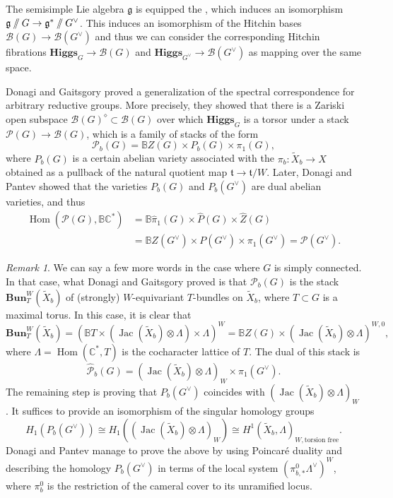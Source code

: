 \documentclass[12pt,a4paper]{amsbook}
\theoremstyle{remark} \newtheorem{rmk}[thm]{Remark}
\theoremstyle{definition} \newtheorem{defn}[thm]{Definition}
\theoremstyle{definition} \newtheorem{ex}[thm]{Example}
\theoremstyle{definition} \newtheorem{ej}{Exercise}
\let\emph\relax
\newcommand{\git}{\mathbin{/\mkern-6mu/}}
\newcommand{\C}{\mathbb C}
\newcommand{\bbB}{\mathbb B}
\newcommand{\cB}{\mathcal B}
\newcommand{\cP}{\mathcal P}
\newcommand{\fg}{\mathfrak{g}}
\DeclareMathOperator{\Hom}{Hom}
\DeclareMathOperator{\Jac}{Jac}
\begin{document}
The semisimple Lie algebra $\fg$ is equipped the \emph{Killing form}, which induces an isomorphism $\fg \git G \rightarrow \fg^* \git G^\vee$. This induces an isomorphism of the Hitchin bases $\cB(G)\rightarrow \cB(G^\vee)$ and thus we can consider the corresponding Hitchin fibrations $\mathbf{Higgs}_G\rightarrow \cB(G)$ and $\mathbf{Higgs}_{G^\vee}\rightarrow \cB(G^\vee)$ as mapping over the same space.

Donagi and Gaitsgory \cite{DonagiGaitsgory} proved a generalization of the spectral correspondence for arbitrary reductive groups. More precisely, they showed that there is a Zariski open subspace $\cB(G)^\diamond \subset \cB(G)$ over which $\mathbf{Higgs}_G$ is a torsor under a stack $\cP(G)\rightarrow \cB(G)$, which is a family of stacks of the form
\begin{equation*}
\cP_b(G) = \bbB Z(G) \times P_b(G) \times \pi_1(G),
\end{equation*}
where $P_b(G)$ is a certain abelian variety associated with the \emph{cameral cover} $\pi_b:\tilde{X}_b \rightarrow X$ obtained as a pullback of the natural quotient map $\mathfrak{t}\rightarrow \mathfrak{t}/W$. Later, Donagi and Pantev \cite{DonagiPantev} showed that the varieties $P_b(G)$ and $P_b(G^\vee)$ are dual abelian varieties, and thus
\begin{align*}
\Hom(\cP(G),\bbB\C^*) &= \bbB \hat{\pi}_1(G) \times \hat{P}(G) \times \hat{Z}(G) \\ &= \bbB Z(G^\vee) \times P(G^\vee) \times \pi_1(G^\vee) = \cP(G^\vee).
\end{align*}

\begin{rmk}
  We can say a few more words in the case where $G$ is simply connected. In that case, what Donagi and Gaitsgory proved is that $\cP_b(G)$ is the stack $\mathbf{Bun}^W_T(\tilde{X}_b)$ of (strongly) $W$-equivariant $T$-bundles on $\tilde{X}_b$, where $T\subset G$ is a maximal torus. In this case, it is clear that
  \begin{equation*}
\mathbf{Bun}^W_T(\tilde{X}_b) = (\bbB T \times (\Jac(\tilde{X}_b)\otimes \Lambda) \times \Lambda )^W = \bbB Z(G) \times (\Jac(\tilde{X}_b)\otimes \Lambda)^{W,0},
  \end{equation*}
  where $\Lambda=\Hom(\C^*,T)$ is the cocharacter lattice of $T$. The dual of this stack is
  \begin{equation*}
\hat{\cP}_b(G) = (\Jac(\tilde{X}_b)\otimes \Lambda)_{W} \times \pi_1(G^\vee).
  \end{equation*}
The remaining step is proving that $P_b(G^\vee)$ coincides with $(\Jac(\tilde{X}_b)\otimes \Lambda)_{W}$. It suffices to provide an isomorphism of the singular homology groups \[H_1(P_b(G^\vee)) \cong H_1((\Jac(\tilde{X}_b)\otimes \Lambda)_{W}) \cong H^1(\tilde{X}_b,\Lambda)_{W,\text{torsion free}}.\]
Donagi and Pantev manage to prove the above by using Poincaré duality and describing the homology $P_b(G^\vee)$ in terms of the local system $(\pi_{b,*}^0 \Lambda^\vee)^W$, where $\pi_b^0$ is the restriction of the cameral cover to its unramified locus.
\end{rmk}
\end{document}
